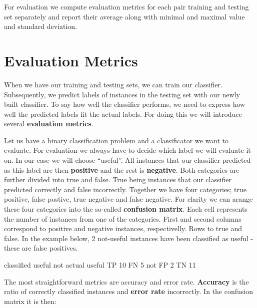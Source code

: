 For evaluation we compute evaluation metrics for each pair training and testing set separately and report their average along with minimal and maximal value and standard deviation.



\section{Evaluation Metrics}

When we have our training and testing sets, we can train our classifier.
Subsequently, we predict labels of instances in the testing set with our newly
built classifier.
To say how well the classifier performs, we need to express how well the predicted
labels fit the actual labels.
For doing this we will introduce several {\bf evaluation metrics}.

Let us have a binary classification problem and a classificator we want to evaluate.
For evaluation we always have to decide which label we will evaluate it on.
In our case we will choose ``useful''.
All instances that our classifier predicted as this label are then {\bf positive} and the rest is {\bf negative}.
Both categories are further divided into true and false.
True being instances that our classifier predicted correctly and false incorrectly.
Together we have four categories;
true positive, false postive, true negative and false negative.
For clarity we can arange these four categories into the so-called {\bf confusion matrix}.
Each cell represents the number of instances from one of the categories.
First and second columns correspond to positive and negative instances, respectivelly.
Rows to true and false.
In the example below, 2 not-useful instances have been classified as useful - these are false positives.

\begin{code}
        classified    useful       not
actual
useful                TP 10        FN  5
not                   FP  2        TN  11
\end{code}


The most straightforward metrics are accuracy and error rate.
{\bf Accuracy} is the ratio of correctly classified instances and {\bf error rate} incorrectly.
In the confusion matrix it is then:


